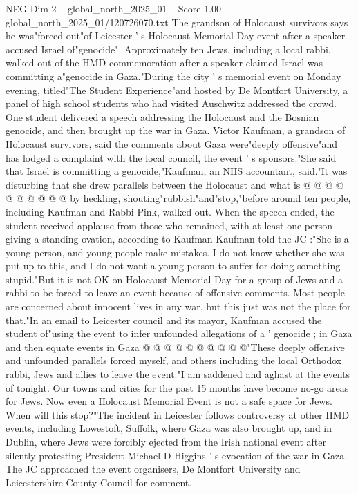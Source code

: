 \begin{textsample}{NEG Dim 2 – global\_north\_2025\_01 – Score 1.00 – global\_north\_2025\_01/120726070.txt}  \label{ex:f2_neg_045}
The grandson of Holocaust survivors says he was"forced out"of Leicester ' s Holocaust Memorial Day event after a speaker accused Israel of"genocide".
Approximately ten Jews, including a local rabbi, walked out of the HMD commemoration after a speaker claimed Israel was committing a"genocide in Gaza."During the city ' s memorial event on Monday evening, titled"The Student Experience"and hosted by De Montfort University, a panel of high school students who had visited Auschwitz addressed the crowd.
One student delivered a speech addressing the Holocaust and the Bosnian genocide, and then brought up the war in Gaza.
Victor Kaufman, a grandson of Holocaust survivors, said the comments about Gaza were"deeply offensive"and has lodged a complaint with the local council, the event ' s sponsors."She said that Israel is committing a genocide,"Kaufman, an NHS accountant, said."It was disturbing that she drew parallels between the Holocaust and what is @ @ @ @ @ @ @ @ @ @ by heckling, shouting"rubbish"and"stop,"before around ten people, including Kaufman and Rabbi Pink, walked out.
When the speech ended, the student received applause from those who remained, with at least one person giving a standing ovation, according to Kaufman Kaufman told the JC :"She is a young person, and young people make mistakes.
I do not know whether she was put up to this, and I do not want a young person to suffer for doing something stupid."But it is not OK on Holocaust Memorial Day for a group of Jews and a rabbi to be forced to leave an event because of offensive comments.
Most people are concerned about innocent lives in any war, but this just was not the place for that."In an email to Leicester council and its mayor, Kaufman accused the student of"using the event to infer unfounded allegations of a ' genocide ; in Gaza and then equate events in Gaza @ @ @ @ @ @ @ @ @ @"These deeply offensive and unfounded parallels forced myself, and others including the local Orthodox rabbi, Jews and allies to leave the event."I am saddened and aghast at the events of tonight.
Our towns and cities for the past 15 months have become no-go areas for Jews.
Now even a Holocaust Memorial Event is not a safe space for Jews.
When will this stop?"The incident in Leicester follows controversy at other HMD events, including Lowestoft, Suffolk, where Gaza was also brought up, and in Dublin, where Jews were forcibly ejected from the Irish national event after silently protesting President Michael D Higgins ' s evocation of the war in Gaza.
The JC approached the event organisers, De Montfort University and Leicestershire County Council for comment.

\end{textsample}
